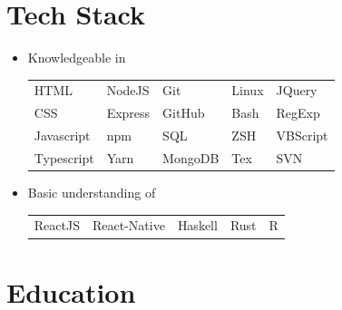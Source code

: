 \documentclass[a4paper]{article}
\begin{document}
\section*{ Tech Stack}
\begin{itemize}
    \item Knowledgeable in

          \begin{tabularx}{0.9\textwidth}{XXXXX}
              HTML       & NodeJS  & Git     & Linux & JQuery   \\
              CSS        & Express & GitHub  & Bash  & RegExp   \\
              Javascript & npm     & SQL     & ZSH   & VBScript \\
              Typescript & Yarn    & MongoDB & Tex   & SVN      \\
          \end{tabularx}
    \item Basic understanding of

          \begin{tabularx}{0.9\textwidth}{XXXXX}
              ReactJS & React-Native & Haskell & Rust & R
          \end{tabularx}

\end{itemize}
\section*{ Education}






\end{document}
